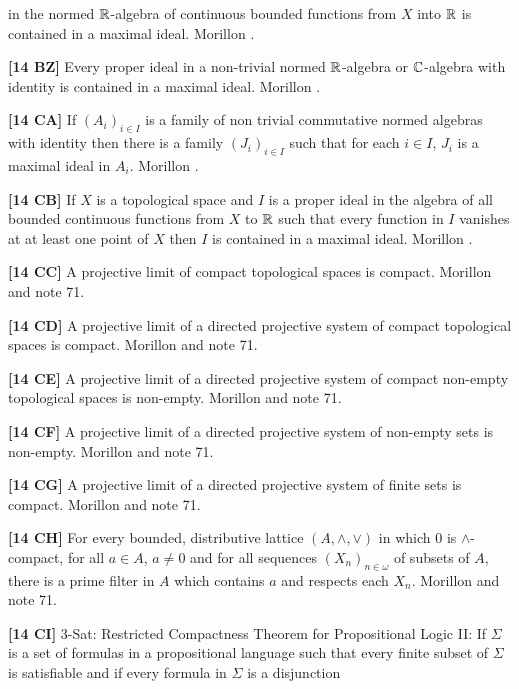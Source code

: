 in the normed ${\Bbb R}$-algebra of continuous bounded functions from
$X$ into $\Bbb R$ is contained in a maximal ideal. \ac{Morillon}
\cite{1988}.
\smallskip
\item{}{\bf [14 BZ]} Every proper ideal in a non-trivial normed
$\Bbb R$-algebra or $\Bbb C$-algebra with identity is contained in a
maximal ideal. \ac{Morillon} \cite{1988}.
\smallskip
\item{}{\bf [14 CA]} If $(A_i)_{i\in I}$ is a family of non trivial
commutative normed algebras with identity then there is a family
$(J_i)_{i\in I}$ such that for each $i\in I$, $J_i$ is a maximal
ideal in $A_i$.  \ac{Morillon} \cite{1988}.
\smallskip
\item{}{\bf [14 CB]} If $X$ is a topological space and $I$ is a proper ideal
in the algebra of all bounded continuous functions from $X$ to $\Bbb R$
such that every function in $I$ vanishes at at least one point of $X$
then $I$ is contained in a maximal ideal.  \ac{Morillon} \cite{1988}.
\smallskip
\item{}{\bf [14 CC]} A projective limit of compact topological spaces is
compact.  \ac{Morillon} \cite{1988} and note 71.
\smallskip
\item{}{\bf [14 CD]} A projective limit of a directed projective system of
compact topological spaces is compact.  \ac{Morillon} \cite{1988} and
note 71.
\smallskip
\item{}{\bf [14 CE]} A projective limit of a directed projective system of
compact non-empty topological spaces is non-empty.  \ac{Morillon}
\cite{1988} and note 71.
\smallskip
\item{}{\bf [14 CF]} A projective limit of a directed projective system of
non-empty sets is non-empty.  \ac{Morillon} \cite{1988} and note 71.
\smallskip
\item{}{\bf [14 CG]} A projective limit of a directed projective system of
finite sets is compact.  \ac{Morillon} \cite{1988} and note 71.
\smallskip
\item{}{\bf [14 CH]} For every bounded, distributive lattice
$(A,\land,\lor)$ in which $0$ is $\land$-compact, for all $a\in A$,
$a\ne 0$ and for all sequences $(X_n)_{n\in\omega}$ of subsets
of $A$, there is a prime filter in $A$ which contains $a$ and respects
each $X_n$.  \ac{Morillon} \cite{1988} and note 71.
\smallskip
\item{}{\bf [14 CI]} 3-Sat:  Restricted Compactness Theorem for
Propositional Logic II:   If $\Sigma$ is a set of formulas in a
propositional language such that every finite subset of $\Sigma$
is satisfiable and if every formula in $\Sigma$ is a disjunction
